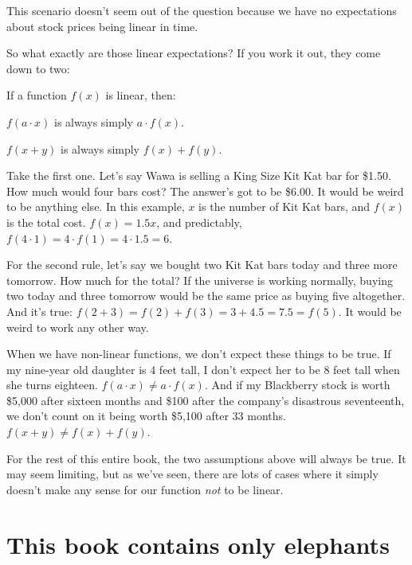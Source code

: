 This scenario doesn't seem out of the question because we have no expectations
about stock prices being linear in time.

\medskip

So what exactly are those linear expectations? If you work it out, they come
down to two:

\begin{framed}
\label{linearExpectations}
If a function $f(x)$ is linear, then:
\begin{compactitem}
\item $f(a\cdot x)$ is always simply $a\cdot f(x)$.
\item $f(x+y)$ is always simply $f(x)+f(y)$.
\end{compactitem}
\end{framed}

Take the first one. Let's say Wawa is selling a King Size Kit Kat bar for
\$1.50. How much would four bars cost? The answer's got to be \$6.00. It would
be weird to be anything else. In this example, $x$ is the number of Kit Kat
bars, and $f(x)$ is the total cost. $f(x) = 1.5x$, and predictably, $f(4\cdot
1) = 4 \cdot f(1) = 4 \cdot 1.5 = 6.$

For the second rule, let's say we bought two Kit Kat bars today and three more
tomorrow. How much for the total? If the universe is working normally, buying
two today and three tomorrow would be the same price as buying five altogether.
And it's true: $f(2+3) = f(2) + f(3) = 3 + 4.5 = 7.5 = f(5)$. It would be weird
to work any other way.

When we have non-linear functions, we don't expect these things to be true. If
my nine-year old daughter is 4 feet tall, I don't expect her to be 8 feet tall
when she turns eighteen. $f(a\cdot x) \neq a\cdot f(x)$. And if my Blackberry
stock is worth \$5,000 after sixteen months and \$100 after the company's
disastrous seventeenth, we don't count on it being worth \$5,100 after 33
months. $f(x+y) \neq f(x)+f(y)$.

For the rest of this entire book, the two assumptions above will always be
true. It may seem limiting, but as we've seen, there are lots of cases where it
simply doesn't make any sense for our function \textit{not} to be linear.

\section{This book contains only elephants}

